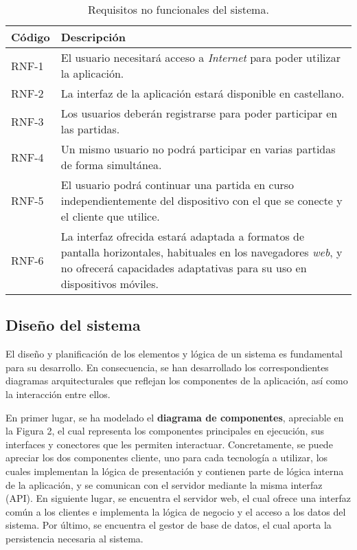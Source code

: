 \documentclass[11pt, a4paper, titlepage]{article}
\begin{document}
\newpage
\begin{table}[h!]
    \centering
    \begin{tabularx}{\textwidth}{|l|X|}
         \hline
         Código & Descripción \\
         \hline
         RNF-1 & El usuario necesitará acceso a \textit{Internet} para poder utilizar la aplicación.\\
         \hline
         RNF-2 & La interfaz de la aplicación estará disponible en castellano.\\
         \hline
         RNF-3 & Los usuarios deberán registrarse para poder participar en las partidas.\\
         \hline
         RNF-4 & Un mismo usuario no podrá participar en varias partidas de forma simultánea. \\
         \hline
         RNF-5 & El usuario podrá continuar una partida en curso independientemente del dispositivo con el que se conecte y el cliente que utilice.\\
         \hline
         RNF-6 & La interfaz ofrecida estará adaptada a formatos de pantalla horizontales, habituales en los navegadores \textit{web}, y no ofrecerá capacidades adaptativas para su uso en dispositivos móviles.\\
         \hline
    \end{tabularx}
    \caption{Requisitos no funcionales del sistema.}
    \label{tab:rnf}
\end{table}

\newpage

\subsection{Diseño del sistema}

El diseño y planificación de los elementos y lógica de un sistema es fundamental para su desarrollo. En consecuencia, se han desarrollado los correspondientes diagramas arquitecturales que reflejan los componentes de la aplicación, así como la interacción entre ellos. \newline

En primer lugar, se ha modelado el \textbf{diagrama de componentes}, apreciable en la Figura 2, el cual representa los componentes principales en ejecución, sus interfaces y conectores que les permiten interactuar. Concretamente, se puede apreciar los dos componentes cliente, uno para cada tecnología a utilizar, los cuales implementan la lógica de presentación y contienen parte de lógica interna de la aplicación, y se comunican con el servidor mediante la misma interfaz (API). En siguiente lugar, se encuentra el servidor web, el cual ofrece una interfaz común a los clientes e implementa la lógica de negocio y el acceso a los datos del sistema. Por último, se encuentra el gestor de base de datos, el cual aporta la persistencia necesaria al sistema.
\end{document}
